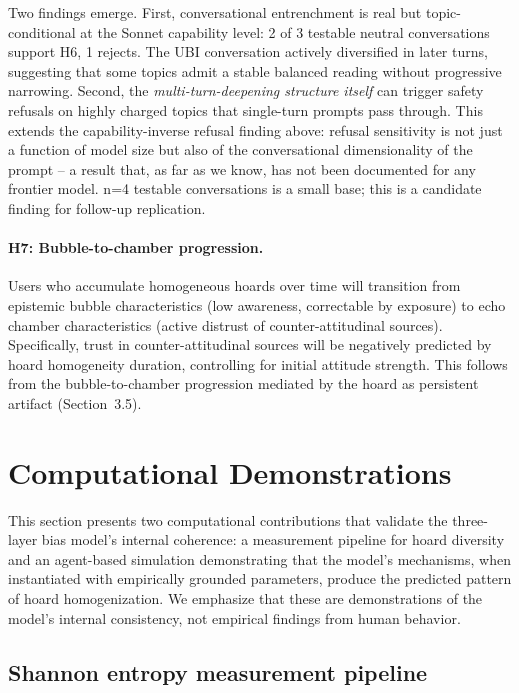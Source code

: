 \documentclass[12pt,a4paper]{article}
\begin{document}
Two findings emerge. First, conversational entrenchment is real but topic-conditional at the Sonnet capability level: 2 of 3 testable neutral conversations support H6, 1 rejects. The UBI conversation actively diversified in later turns, suggesting that some topics admit a stable balanced reading without progressive narrowing. Second, the \emph{multi-turn-deepening structure itself} can trigger safety refusals on highly charged topics that single-turn prompts pass through. This extends the capability-inverse refusal finding above: refusal sensitivity is not just a function of model size but also of the conversational dimensionality of the prompt -- a result that, as far as we know, has not been documented for any frontier model. n=4 testable conversations is a small base; this is a candidate finding for follow-up replication.

\paragraph{H7: Bubble-to-chamber progression.}
Users who accumulate homogeneous hoards over time will transition from epistemic bubble characteristics (low awareness, correctable by exposure) to echo chamber characteristics (active distrust of counter-attitudinal sources).
Specifically, trust in counter-attitudinal sources will be negatively predicted by hoard homogeneity duration, controlling for initial attitude strength.
This follows from the bubble-to-chamber progression mediated by the hoard as persistent artifact (Section~3.5).


\section{Computational Demonstrations}

This section presents two computational contributions that validate the three-layer bias model's internal coherence: a measurement pipeline for hoard diversity and an agent-based simulation demonstrating that the model's mechanisms, when instantiated with empirically grounded parameters, produce the predicted pattern of hoard homogenization.
We emphasize that these are demonstrations of the model's internal consistency, not empirical findings from human behavior.


\subsection{Shannon entropy measurement pipeline}
\end{document}
